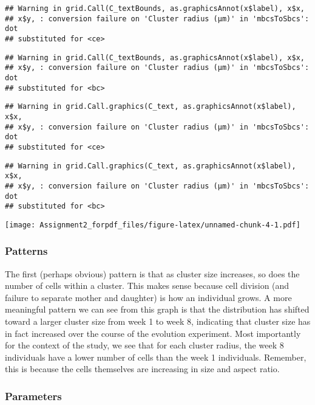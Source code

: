 \documentclass[]{article}
\begin{document}
\begin{verbatim}
## Warning in grid.Call(C_textBounds, as.graphicsAnnot(x$label), x$x,
## x$y, : conversion failure on 'Cluster radius (μm)' in 'mbcsToSbcs': dot
## substituted for <ce>
\end{verbatim}

\begin{verbatim}
## Warning in grid.Call(C_textBounds, as.graphicsAnnot(x$label), x$x,
## x$y, : conversion failure on 'Cluster radius (μm)' in 'mbcsToSbcs': dot
## substituted for <bc>
\end{verbatim}

\begin{verbatim}
## Warning in grid.Call.graphics(C_text, as.graphicsAnnot(x$label), x$x,
## x$y, : conversion failure on 'Cluster radius (μm)' in 'mbcsToSbcs': dot
## substituted for <ce>
\end{verbatim}

\begin{verbatim}
## Warning in grid.Call.graphics(C_text, as.graphicsAnnot(x$label), x$x,
## x$y, : conversion failure on 'Cluster radius (μm)' in 'mbcsToSbcs': dot
## substituted for <bc>
\end{verbatim}

\texttt{[image: Assignment2\_forpdf\_files/figure-latex/unnamed-chunk-4-1.pdf]}

\subsubsection{Patterns}\label{patterns}

The first (perhaps obvious) pattern is that as cluster size increases,
so does the number of cells within a cluster. This makes sense because
cell division (and failure to separate mother and daughter) is how an
individual grows. A more meaningful pattern we can see from this graph
is that the distribution has shifted toward a larger cluster size from
week 1 to week 8, indicating that cluster size has in fact increased
over the course of the evolution experiment. Most importantly for the
context of the study, we see that for each cluster radius, the week 8
individuals have a lower number of cells than the week 1 individuals.
Remember, this is because the cells themselves are increasing in size
and aspect ratio.

\subsubsection{Parameters}\label{parameters}
\end{document}
